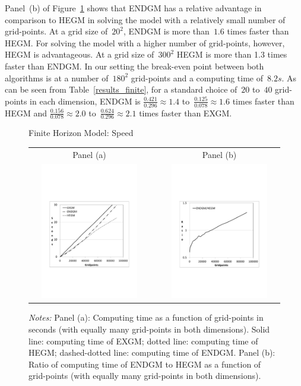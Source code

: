 \documentclass[a4paper,12pt]{article}
\begin{document}
Panel~(b) of Figure~\ref{graph_finte} shows that ENDGM has a relative advantage in comparison to HEGM in solving the model with a relatively small number of grid-points. At a grid size of~$20^{2}$, ENDGM is more than~$1.6$ times faster than HEGM. For solving the model with a higher number of grid-points, however, HEGM is advantageous. At a grid size of~$300^{2}$ HEGM is more than 1.3 times faster than ENDGM. In our setting the break-even point between both algorithms is at a number of~$180^{2}$ grid-points and a computing time of~$8.2s$. As can be seen from Table~\ref{results_finite}, for a standard choice of~$20$ to~$40$ grid-points in each dimension, ENDGM is $\frac{0.421} {0.296} \approx 1.4$ to~$\frac{0.125} {0.078} \approx 1.6$ times faster than HEGM and $\frac{0.156} {0.078} \approx 2.0$ to~$\frac{0.624} {0.296} \approx 2.1$ times faster than EXGM.
\begin{figure}[htb]
	\caption{Finite Horizon Model: Speed}
	\label{graph_finte}
	\centering
	\begin{tabular}{cC{1cm}c}
	Panel (a) & & Panel (b)\\
	\includegraphics[height=6.0cm, width=6.0cm]{Abbildungen/Seconds_Finite.pdf} & & \includegraphics[height=6.0cm, width=6.0cm]{Abbildungen/Ratio_Finite.pdf} \\
	\end{tabular}
	\caption*{\footnotesize{\emph{Notes:} Panel (a): Computing time as a function of grid-points in seconds (with equally many grid-points in both dimensions). Solid line: computing time of EXGM; dotted line: computing time of HEGM; dashed-dotted line: computing time of ENDGM. Panel (b): Ratio of computing time of ENDGM to HEGM as a function of grid-points (with equally many grid-points in both dimensions).}}
\end{figure}
\end{document}

